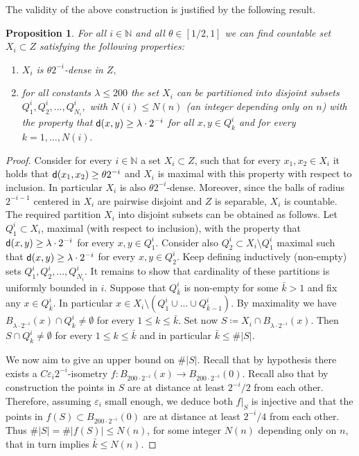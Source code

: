 \documentclass[11pt]{article}
\newcommand{\eps}{\varepsilon}
\newcommand{\nn}{\mathbb{N}}
\newcommand{\sfd}{{\sf d}}
\newcommand{\X}{{\rm X}}
\theoremstyle{plain}
\newtheorem{prop}[theorem]{Proposition}
\theoremstyle{definition}
\numberwithin{equation}{section}
\begin{document}
The validity of the above construction is justified by the following result.
\begin{prop}\label{prop:covering}
     For all $i\in\nn$ and all $\theta \in [1/2,1]$ we can find countable set $X_i \subset Z$ satisfying the following properties:
     \begin{enumerate}[label=\roman*)]
         \item $X_i$ is $\theta 2^{-i}$-dense in $Z,$
         \item for all constants $\lambda\le 200$ the set $X_i$ can be partitioned into disjoint subsets $Q^i_1,Q^i_2,...,Q^i_{N_i},$ with $N(i)\le N(n)$ (an integer depending only on $n$) with the property that $\sfd(x,y)\ge\lambda \cdot 2^{-i}$ for all $x,y \in Q^i_k$ and for every $k=1,\dots,N(i).$
     \end{enumerate}
\end{prop}
\begin{proof}
Consider  for every $i\in \mathbb{N}$ a set $X_i \subset Z$, such that for every $x_1,x_2 \in X_i$ it holds that $\sfd(x_1,x_2)\ge \theta 2^{-i}$ and $X_i$ is maximal with this property with respect to inclusion. In particular $X_i$ is also $\theta 2^{-i}$-dense. Moreover, since the balls of radius $2^{-i-1}$ centered in $X_i$  are  pairwise disjoint and $Z$ is separable, $X_i$ is countable. 
 The required partition $X_i$ into disjoint subsets can be obtained as follows.	Let $Q_1^i \subset X_i$, maximal (with respect to inclusion), with the property that $\sfd(x,y)\ge \lambda\cdot 2^{-i} $ for every $x,y \in Q^i_1.$ Consider also $Q^i_2\subset X_i\setminus Q^i_1$ maximal such that $\sfd(x,y)\ge\lambda \cdot 2^{-i}$ for every $x,y \in Q^i_2.$ Keep defining  inductively (non-empty) sets $Q^i_1,Q^i_2,...,Q^i_{N_i}.$ It remains to show that cardinality of these partitions is uniformly bounded in $i$.
 Suppose that $Q^i_{\bar k}$ is non-empty for some $\bar k>1$ and fix any $x \in Q^i_{\bar k}$. In particular $x \in X_i\setminus (Q_1^i\cup...\cup Q^i_{\bar k-1})$.
	By maximality we have $B_{\lambda \cdot 2^{-i}}(x) \cap Q^i_k \neq \emptyset$ for every $1\le k \le \bar k.$  Set now $S\coloneqq  X_i \cap B_{\lambda \cdot 2^{-i}}(x)$. Then $S\cap  Q^i_k \neq \emptyset$ for every $1\le k \le \bar k$ and in particular $\bar k\le \#|S|.$ 
	
	We now aim to give an upper bound on $\#|S|$.
	Recall that by  hypothesis  there exists a $C\eps_i2^{-i} $-isometry $f : B_{200\cdot 2^{-i}}(x) \to B_{200\cdot 2^{-i}}(0)$. Recall also that by construction the points in $S$ are at distance at least $2^{-i}/2$  from each other. Therefore, assuming  $\eps_i$ small enough, we deduce both $f|_S$ is injective and that the points in $f(S) \subset B_{200\cdot 2^{-i}}(0) $ are at distance at least $2^{-i}/4$  from each other. Thus $\#|S|=\#|f(S)|\le N(n)$, for some integer $N(n)$ depending only on $n$, that in turn implies $\bar k\le N(n).$
\end{proof}
\end{document}

